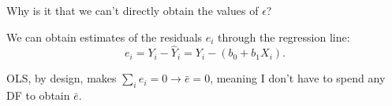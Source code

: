 \documentclass[12pt]{notes}
\begin{document}
Why is it that we can't directly obtain the values of $\epsilon$?

\begin{minipage}[l][2cm][c]{\textwidth}
\end{minipage}

We can obtain estimates of the residuals $e_i$ through the regression line: 
\[
e_i = Y_i - \hat{Y}_i = Y_i - (b_0 + b_1X_i).
\]

\nspace
OLS, by design, makes $\sum_ie_i = 0 \rightarrow \bar{e} = 0$, meaning I don't have to spend any DF to obtain $\bar{e}$. 


\end{document}
